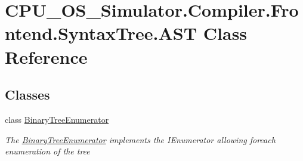 \hypertarget{class_c_p_u___o_s___simulator_1_1_compiler_1_1_frontend_1_1_syntax_tree_1_1_a_s_t}{}\section{C\+P\+U\+\_\+\+O\+S\+\_\+\+Simulator.\+Compiler.\+Frontend.\+Syntax\+Tree.\+A\+S\+T Class Reference}
\label{class_c_p_u___o_s___simulator_1_1_compiler_1_1_frontend_1_1_syntax_tree_1_1_a_s_t}
\subsection*{Classes}
\begin{DoxyCompactItemize}
\item 
class \hyperlink{class_c_p_u___o_s___simulator_1_1_compiler_1_1_frontend_1_1_syntax_tree_1_1_a_s_t_1_1_binary_tree_enumerator}{Binary\+Tree\+Enumerator}
\begin{DoxyCompactList}\small\item\em The \hyperlink{class_c_p_u___o_s___simulator_1_1_compiler_1_1_frontend_1_1_syntax_tree_1_1_a_s_t_1_1_binary_tree_enumerator}{Binary\+Tree\+Enumerator} implements the I\+Enumerator allowing foreach enumeration of the tree \end{DoxyCompactList}\end{DoxyCompactItemize}
